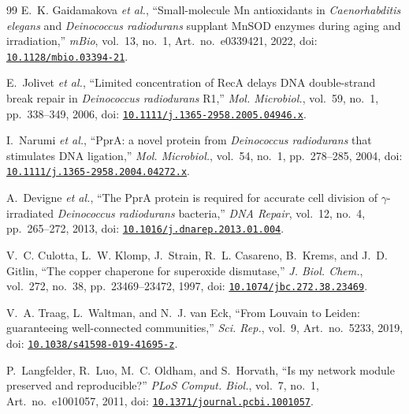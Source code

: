 \documentclass[conference]{IEEEtran}
\begin{document}
\begin{thebibliography}{99}
E.~K. Gaidamakova \emph{et al.}, ``Small-molecule Mn antioxidants in \emph{Caenorhabditis
elegans} and \emph{Deinococcus radiodurans} supplant MnSOD enzymes during aging and
irradiation,'' \emph{mBio}, vol.~13, no.~1, Art.~no.~e0339421, 2022,
doi: \href{https://doi.org/10.1128/mbio.03394-21}{\nolinkurl{10.1128/mbio.03394-21}}.

E.~Jolivet \emph{et al.}, ``Limited concentration of RecA delays DNA double-strand break repair
in \emph{Deinococcus radiodurans} R1,'' \emph{Mol. Microbiol.}, vol.~59, no.~1, pp.~338--349,
2006, doi: \href{https://doi.org/10.1111/j.1365-2958.2005.04946.x}{\nolinkurl{10.1111/j.1365-2958.2005.04946.x}}.

I.~Narumi \emph{et al.}, ``PprA: a novel protein from \emph{Deinococcus radiodurans} that
stimulates DNA ligation,'' \emph{Mol. Microbiol.}, vol.~54, no.~1, pp.~278--285, 2004,
doi: \href{https://doi.org/10.1111/j.1365-2958.2004.04272.x}{\nolinkurl{10.1111/j.1365-2958.2004.04272.x}}.

A.~Devigne \emph{et al.}, ``The PprA protein is required for accurate cell division of
$\gamma$-irradiated \emph{Deinococcus radiodurans} bacteria,'' \emph{DNA Repair}, vol.~12,
no.~4, pp.~265--272, 2013,
doi: \href{https://doi.org/10.1016/j.dnarep.2013.01.004}{\nolinkurl{10.1016/j.dnarep.2013.01.004}}.

V.~C. Culotta, L.~W. Klomp, J.~Strain, R.~L. Casareno, B.~Krems, and J.~D. Gitlin, ``The copper
chaperone for superoxide dismutase,'' \emph{J. Biol. Chem.}, vol.~272, no.~38, pp.~23469--23472,
1997, doi: \href{https://doi.org/10.1074/jbc.272.38.23469}{\nolinkurl{10.1074/jbc.272.38.23469}}.

V.~A. Traag, L.~Waltman, and N.~J. van Eck, ``From Louvain to Leiden: guaranteeing
well-connected communities,'' \emph{Sci. Rep.}, vol.~9, Art.~no.~5233, 2019,
doi: \href{https://doi.org/10.1038/s41598-019-41695-z}{\nolinkurl{10.1038/s41598-019-41695-z}}.

P.~Langfelder, R.~Luo, M.~C. Oldham, and S.~Horvath, ``Is my network module preserved and
reproducible?'' \emph{PLoS Comput. Biol.}, vol.~7, no.~1, Art.~no.~e1001057, 2011,
doi: \href{https://doi.org/10.1371/journal.pcbi.1001057}{\nolinkurl{10.1371/journal.pcbi.1001057}}.

\end{thebibliography}
\end{document}
